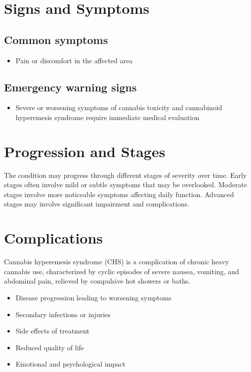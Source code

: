 \section{Signs and Symptoms}

\subsection{Common symptoms}
\begin{itemize}[noitemsep]
  \item Pain or discomfort in the affected area
  \end{itemize}

\subsection{Emergency warning signs}
\begin{itemize}[noitemsep]
  \item Severe or worsening symptoms of cannabis toxicity and cannabinoid hyperemesis syndrome require immediate medical evaluation
\end{itemize}
\section{Progression and Stages}
The condition may progress through different stages of severity over time. Early stages often involve mild or subtle symptoms that may be overlooked. Moderate stages involve more noticeable symptoms affecting daily function. Advanced stages may involve significant impairment and complications.
\section{Complications}
Cannabis hyperemesis syndrome (CHS) is a complication of chronic heavy cannabis use, characterized by cyclic episodes of severe nausea, vomiting, and abdominal pain, relieved by compulsive hot showers or baths.

\begin{itemize}[noitemsep]
  \item Disease progression leading to worsening symptoms
  \item Secondary infections or injuries
  \item Side effects of treatment
  \item Reduced quality of life
  \item Emotional and psychological impact
\end{itemize}

